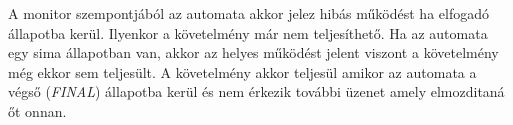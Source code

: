 A monitor szempontjából az automata akkor jelez hibás működést ha elfogadó állapotba kerül.
Ilyenkor a követelmény már nem teljesíthető.
Ha az automata egy sima állapotban van, akkor az helyes működést jelent viszont a követelmény még ekkor sem teljesült.
A követelmény akkor teljesül amikor az automata a végső (\textit{FINAL}) állapotba kerül és nem érkezik további üzenet amely elmozditaná őt onnan.